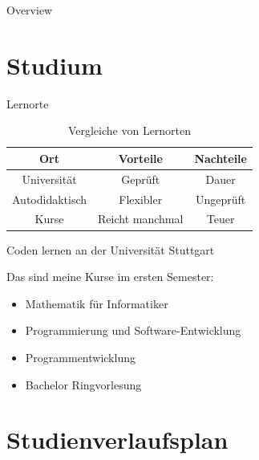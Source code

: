 



\begin{frame}{Overview}
    \tableofcontents
\end{frame}





\section{Studium}

\begin{frame}{Lernorte}
    \begin{table}[h!]
	\centering
	\begin{tabular}{c|c|c}
	Ort & Vorteile  & Nachteile  \\ \hline \hline
	Universität & Geprüft & Dauer \\ \hline
	Autodidaktisch & Flexibler & Ungeprüft   \\ \hline
	Kurse & Reicht manchmal & Teuer   \\ \hline
	\end{tabular}
	\caption{Vergleiche von Lernorten}
	\label{tab:VergleichLernorte}
	\end{table}

\end{frame}


\begin{frame}{Coden lernen an der Universität Stuttgart}

    Das sind meine Kurse im ersten Semester:
    \begin{itemize}
        \item
        Mathematik für Informatiker
        \pause

        \item
        Programmierung und Software-Entwicklung
        \pause

        \item
        Programmentwicklung 
        \pause
        
        \item
        Bachelor Ringvorlesung
       
       
    \end{itemize}
\end{frame}




\section{Studienverlaufsplan}

